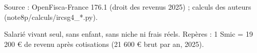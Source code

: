 Source : OpenFisca-France 176.1 (droit des revenus 2025) ; calculs des auteurs (note8p/calculs/ircsg4\_*.py).\par Salarié vivant seul, sans enfant, sans niche ni frais réels. Repères : 1 Smic = 19 200 € de revenu après cotisations (21 600 € brut par an, 2025).
